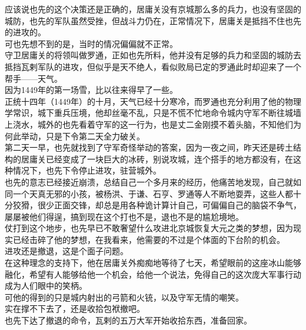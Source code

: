 \begin{multicols}{\theparacolNo}
应该说也先的这个决策还是正确的，居庸关没有京城那么多的兵力，也没有坚固的城防，也先的军队虽然受挫，但战斗力仍在，正常情况下，居庸关是抵挡不住也先的进攻的。\\

可也先想不到的是，当时的情况偏偏就不正常。\\

守卫居庸关的将领叫做罗通，正如也先所料，他并没有足够的兵力和坚固的城防去抵挡瓦剌军队的进攻，但似乎是天不绝人，看似败局已定的罗通此时却迎来了一个帮手——天气。\\

因为1449年的第一场雪，比以往来得早了一些。\\

正统十四年（1449年）的十月，天气已经十分寒冷，而罗通也充分利用了他的物理学常识，城下重兵压境，他却丝毫不乱，只是不慌不忙地命令城内守军不断往城墙上浇水，城外的也先看着守军的这一行为，也是丈二金刚摸不着头脑，不知他们为何此举动，只是下令第二天全力破关。\\

第二天一早，也先就找到了守军奇怪举动的答案，因为一夜之间，昨天还是砖土结构的居庸关已经变成了一块巨大的冰砖，别说攻城，连个搭手的地方都没有，在这种情况下，也先下令停止进攻，驻营城外。\\

也先的意志已经接近崩溃，总结自己一个多月来的经历，他痛苦地发现，自己就如同一个天真无邪的小孩，被杨洪、于谦、石亨、罗通等人不断地耍弄，这些人都十分狡猾，很少正面交锋，却总是用各种诡计算计自己，可偏偏自己的脑袋不争气，屡屡被他们得逞，搞到现在这个打也不是，退也不是的尴尬境地。\\

仗打到这个地步，也先早已不敢奢望什么攻进北京城恢复大元之类的梦想，因为现实已经击碎了他的梦想，在我看来，他需要的不过是个体面的下台阶的机会。\\

进攻还是撤退，这是个面子问题。\\

在这种理念的支持下，他在居庸关外痴痴地等待了七天，希望眼前的这座冰山能够融化，希望有人能够给他一个机会，给他一个说法，免得自己的这次庞大军事行动成为人们眼中的笑柄。\\

可他的得到的只是城内射出的弓箭和火铳，以及守军无情的嘲笑。\\

实在撑不下去了，还是收拾包袱撤吧。\\

也先下达了撤退的命令，瓦剌的五万大军开始收拾东西，准备回家。\\


\end{multicols}
